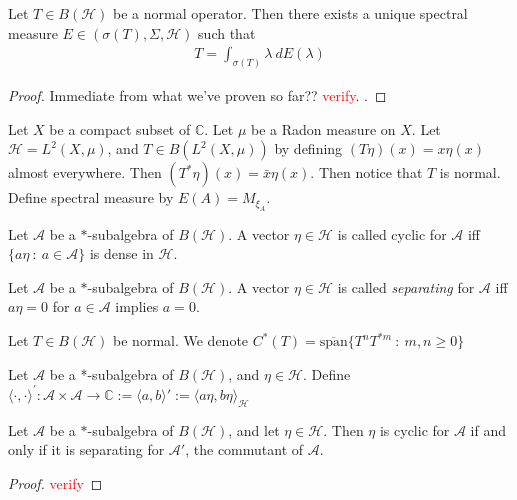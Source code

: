 

\begin{theorem}
  Let $T \in B(\mathcal{H})$ be a normal operator. Then there exists
  a unique spectral measure $E \in (\sigma(T), \Sigma, \mathcal{H})$ such that
  \begin{align*}
    T = \int_{\sigma(T)}  \lambda \ d   E(\lambda)
  \end{align*}
\end{theorem}
\begin{proof}
  Immediate from what we've proven so far?? \textcolor{red}{verify}.
  .
\end{proof}

Let $X$ be a compact subset of $\mathbb{C}$. Let $\mu$ be a Radon
measure on $X$. Let $\mathcal{H} = L^{2}(X, \mu)$, and $T \in
B(L^{2}(X, \mu))$ by defining $(T \eta)(x) = x \eta(x)$ almost
everywhere. Then $(T^* \eta)(x) = \bar{x}\eta(x)$.
Then notice that $T$ is normal. Define spectral measure by $E(A) = M_{\xi_A}$.

\begin{definition}
  Let $\mathcal{A}$ be a $*$-subalgebra of $B(\mathcal{H})$. A vector
  $\eta \in \mathcal{H}$ is called cyclic for $\mathcal{A}$ iff $\{ a
  \eta  \ : \   a \in \mathcal{A} \}$ is dense in $\mathcal{H}$.
\end{definition}

\begin{definition}
  Let $\mathcal{A}$ be a $*$-subalgebra of $B(\mathcal{H})$. A vector
  $\eta \in \mathcal{H}$ is called \textit{separating} for $\mathcal{A}$ iff
  $a \eta = 0$ for $a \in \mathcal{A}$ implies $a = 0$.
\end{definition}

\begin{definition}
  Let $T \in B(\mathcal{H})$ be normal. We denote $C^*(T) =
  \overline{\textrm{span}}\{ T^nT^{*m}  \ : \ m, n \ge 0  \}$
\end{definition}

Let $\mathcal{A}$ be a *-subalgebra of $B(\mathcal{H})$, and $\eta
\in \mathcal{H}$. Define $\langle \cdot , \cdot \rangle^\prime :
\mathcal{A} \times \mathcal{A} \to \mathbb{C}:= \langle a , b \rangle'
:= \langle a \eta ,  b \eta \rangle_\mathcal{H}$

\begin{lemma}
  Let $\mathcal{A}$ be a $*$-subalgebra of $B(\mathcal{H})$, and let
  $\eta \in \mathcal{H}$. Then $\eta$ is cyclic for $\mathcal{A}$ if
  and only if it is separating for $\mathcal{A}'$, the commutant of
  $\mathcal{A}$.
\end{lemma}
\begin{proof}
  \textcolor{red}{verify}
\end{proof}

